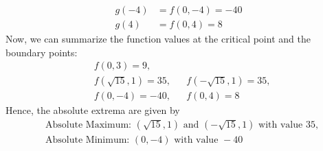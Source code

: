 {\begin{align*}
        g(-4) &= f(0,-4) = -40 \\ 
        g(4) &= f(0,4) = 8
    \end{align*}
    Now, we can summarize the function values at the critical point and the boundary points:
    \begin{align*}
        & f(0,3) = 9, \\ 
        & f(\sqrt{15},1) = 35, && f(-\sqrt{15},1) = 35, \\ 
        & f(0,-4) = -40, && f(0,4) = 8
    \end{align*}
    Hence, the absolute extrema are given by
    \begin{align*}
        &\text{Absolute Maximum: } (\sqrt{15},1) \text{ and } (-\sqrt{15},1) \text{ with value } 35, \\ 
        &\text{Absolute Minimum: } (0,-4) \text{ with value } -40
    \end{align*}
}

